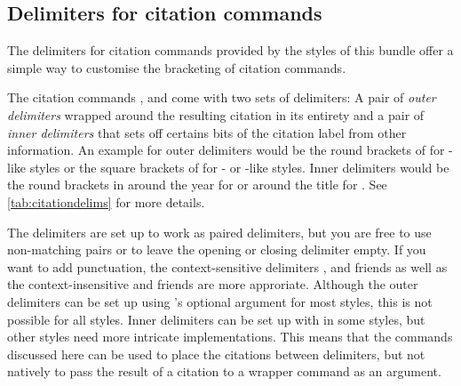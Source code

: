 \documentclass[DIV=9]{scrartcl}
\newcommand*{\highlightbf}[2][1]{\textcolor{highlight#1}{\textbf{#2}}}
\begin{document}
\begin{bibexample}
\renewcommand*{\extradateonlycompcitedelim}{\highlightbf{\addcomma}}
\cite{knuth:ct:b,knuth:ct:c}
\end{bibexample}


\subsection{Delimiters for citation commands}\label{sec:opt:citedelims}
The delimiters for citation commands provided by the styles of this bundle
offer a simple way to customise the bracketing of citation commands.

The citation commands ,  and  come with
two sets of delimiters: A pair of \emph{outer delimiters} wrapped around the
resulting citation in its entirety and a pair of \emph{inner delimiters} that
sets off certains bits of the citation label from other information.
An example for outer delimiters would be the round brackets of 
for -like styles or the square brackets of  for
- or -like styles.
Inner delimiters would be the round brackets in  around
the year for  or around the title for .
See \cref{tab:citationdelims} for more details.

The delimiters are set up to work as paired delimiters, but you are free to
use non-matching pairs or to leave the opening or closing delimiter empty.
If you want to add punctuation, the context-sensitive delimiters
,  and friends as well as
the context-insensitive  and friends are more approriate.
Although the outer delimiters can be set up using 's
optional  argument for most styles, this is not possible for all
styles. Inner delimiters can be set up with  in some
styles, but other styles need more intricate implementations.
This means that the commands discussed here can be used to place the citations
between delimiters, but not natively to pass the result of a citation to a
wrapper command as an argument.%
\end{document}

